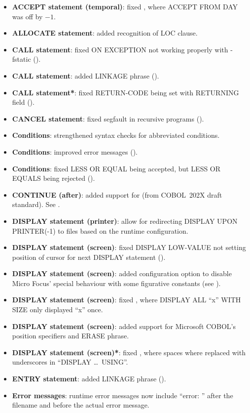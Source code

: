 \begin{itemize}
\begin{itemize}
  \end{itemize}
\item \textbf{ACCEPT statement (temporal)}: fixed , where ACCEPT FROM DAY was off by $-1$.
\item \textbf{ALLOCATE statement}: added recognition of LOC clause.
\item \textbf{CALL statement}: fixed ON EXCEPTION not working properly with -fstatic ().
\item \textbf{CALL statement}: added LINKAGE phrase ().
\item \textbf{CALL statement*}: fixed RETURN-CODE being set with RETURNING field ().
\item \textbf{CANCEL statement}: fixed segfault in recursive programs ().
\item \textbf{Conditions}: strengthened syntax checks for abbreviated conditions.
\item \textbf{Conditions}: improved error messages ().
\item \textbf{Conditions}: fixed LESS OR EQUAL being accepted, but LESS OR EQUALS being rejected ().
\item \textbf{CONTINUE (after)}: added support for (from COBOL~202X draft standard). See .
\item \textbf{DISPLAY statement (printer)}: allow for redirecting DISPLAY UPON PRINTER(-1) to files based on the runtime configuration.
\item \textbf{DISPLAY statement (screen)}: fixed DISPLAY LOW-VALUE not setting position of cursor for next DISPLAY statement ().
\item \textbf{DISPLAY statement (screen)}: added configuration option to disable Micro Focus' special behaviour with some figurative constants (see ).
\item \textbf{DISPLAY statement (screen)}: fixed , where DISPLAY ALL ``x'' WITH SIZE only displayed ``x'' once.
\item \textbf{DISPLAY statement (screen)}: added support for Microsoft COBOL's position specifiers and ERASE phrase.
\item \textbf{DISPLAY statement (screen)*}: fixed , where spaces where replaced with underscores in ``DISPLAY \ldots\ USING''.
\item \textbf{ENTRY statement}: added LINKAGE phrase ().
\item \textbf{Error messages}: runtime error messages now include ``error: '' after the filename and before the actual error message.

\end{itemize}
